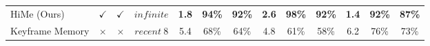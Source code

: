 \begin{table}[t]
{\begin{tabular}{l ccc ccc ccc ccc}
HiMe (Ours) & $\checkmark$ & $\checkmark$ & $infinite$ & \textbf{1.8} & \textbf{94\%} & \textbf{92\%} & \textbf{2.6} & \textbf{98\%} & \textbf{92\%} & \textbf{1.4} & \textbf{92\%} & \textbf{87\%} \\
Keyframe Memory & $\times$ & $\times$ & $recent \ 8$ & 5.4 & 68\% & 64\% & 4.8 & 61\% & 58\% & 6.2 & 76\% & 73\% \\
\bottomrule
\end{tabular}
}
\end{table}